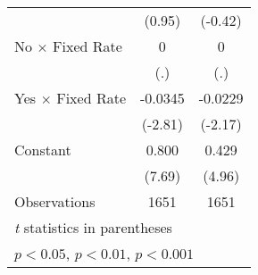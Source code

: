 \begin{table}[htbp]
\begin{tabular}{l*{2}{c}}
                                        &   (0.95)         &  (-0.42)         \\
\addlinespace
No $\times$ Fixed Rate                  &        0         &        0         \\
                                        &      (.)         &      (.)         \\
\addlinespace
Yes $\times$ Fixed Rate                 &  -0.0345\sym{**} &  -0.0229\sym{*}  \\
                                        &  (-2.81)         &  (-2.17)         \\
\addlinespace
Constant                                &    0.800\sym{***}&    0.429\sym{***}\\
                                        &   (7.69)         &   (4.96)         \\
\midrule
Observations                            &     1651         &     1651         \\
\bottomrule
\multicolumn{3}{l}{\footnotesize \textit{t} statistics in parentheses}\\
\multicolumn{3}{l}{\footnotesize \sym{*} \(p<0.05\), \sym{**} \(p<0.01\), \sym{***} \(p<0.001\)}\\
\end{tabular}
\end{table}
